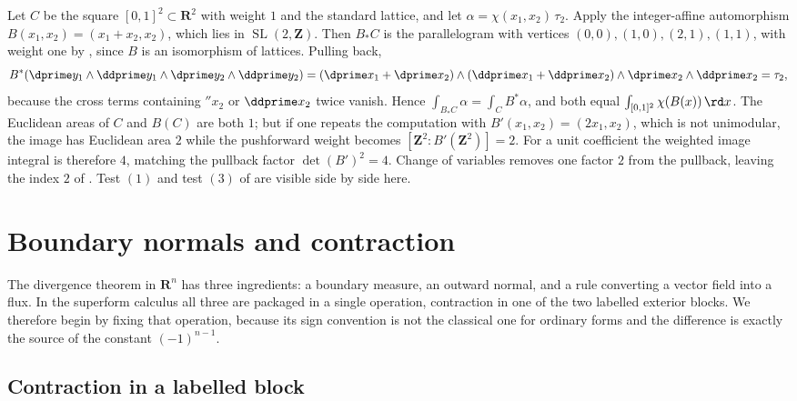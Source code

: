 \begin{example}
\label{ex:ch11-gl2z-test}
Let $C$ be the square $[0,1]^2\subset\mathbf R^2$ with weight $1$ and the
standard lattice, and let
$\alpha=\chi(x_1,x_2)\,\tau_2$.  Apply the integer-affine automorphism
$B(x_1,x_2)=(x_1+x_2,x_2)$, which lies in $\operatorname{SL}(2,\mathbf Z)$.
Then $B_*C$ is the parallelogram with vertices
$(0,0),(1,0),(2,1),(1,1)$, with weight one by
, since $B$ is an isomorphism of
lattices.  Pulling back,
\[
 B^*(\dprime y_1\wedge\ddprime y_1\wedge\dprime y_2\wedge\ddprime y_2)
 =(\dprime x_1+\dprime x_2)\wedge(\ddprime x_1+\ddprime x_2)
   \wedge\dprime x_2\wedge\ddprime x_2
 =\tau_2 ,
\]
because the cross terms containing $\dprime x_2$ or $\ddprime x_2$ twice
vanish.  Hence
$\int_{B_*C}\alpha=\int_C B^*\alpha$, and both equal
$\int_{[0,1]^2}\chi(B(x))\,\rd x$.  The Euclidean areas of $C$ and $B(C)$
are both $1$; but if one repeats the computation with
$B'(x_1,x_2)=(2x_1,x_2)$, which is not unimodular, the image has Euclidean
area $2$ while the pushforward weight becomes
$[\mathbf Z^2:B'(\mathbf Z^2)]=2$.  For a unit coefficient the weighted
image integral is therefore $4$, matching the pullback factor
$\det(B')^2=4$.  Change of variables removes one factor $2$ from the
pullback, leaving the index $2$ of
.  Test $(1)$ and test $(3)$ of
 are visible side by side here.
\end{example}

\section{Boundary normals and contraction}
\label{sec:ch11-boundary}

The divergence theorem in $\mathbf R^n$ has three ingredients: a boundary
measure, an outward normal, and a rule converting a vector field into a
flux.  In the superform calculus all three are packaged in a single
operation, contraction in one of the two labelled exterior blocks.  We
therefore begin by fixing that operation, because its sign convention is not
the classical one for ordinary forms and the difference is exactly the
source of the constant $(-1)^{n-1}$.

\subsection{Contraction in a labelled block}
\label{sec:ch11-contraction}

